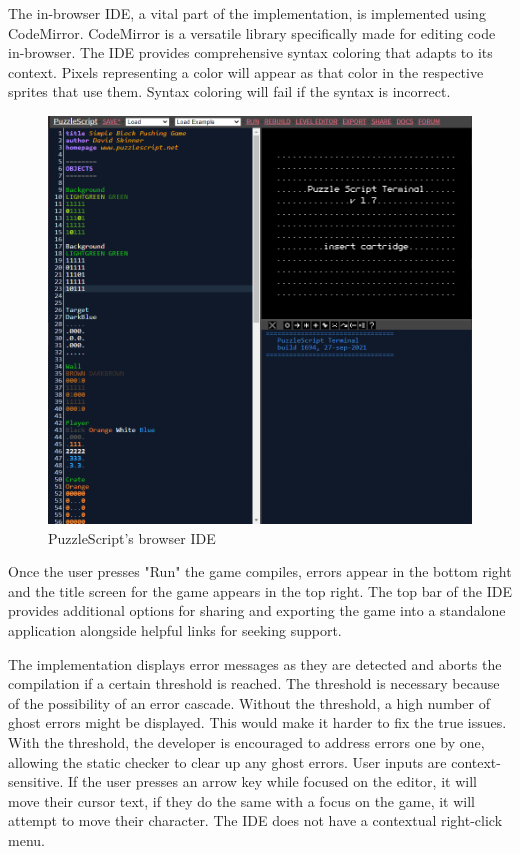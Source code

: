 The in-browser IDE, a vital part of the implementation, is implemented using CodeMirror. CodeMirror is a versatile library specifically made for editing code in-browser. The IDE provides comprehensive syntax coloring that adapts to its context. Pixels representing a color will appear as that color in the respective sprites that use them. Syntax coloring will fail if the syntax is incorrect. 

\begin{figure}[h]
    \centering
    \includegraphics[width=1\textwidth]{images/PuzzleScript_IDE.png}
    \caption{PuzzleScript's browser IDE}
    \label{fig:browser_ide}
\end{figure}

Once the user presses "Run" the game compiles, errors appear in the bottom right and the title screen for the game appears in the top right. The top bar of the IDE provides additional options for sharing and exporting the game into a standalone application alongside helpful links for seeking support.

The implementation displays error messages as they are detected and aborts the compilation if a certain threshold is reached. The threshold is necessary because of the possibility of an error cascade. Without the threshold, a high number of ghost errors might be displayed. This would make it harder to fix the true issues. With the threshold, the developer is encouraged to address errors one by one, allowing the static checker to clear up any ghost errors. User inputs are context-sensitive. If the user presses an arrow key while focused on the editor, it will move their cursor text, if they do the same with a focus on the game, it will attempt to move their character. The IDE does not have a contextual right-click menu.

